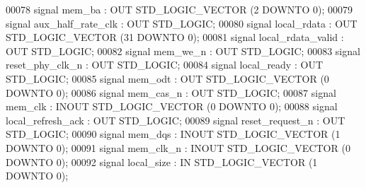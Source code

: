\begin{DoxyCode}
{00078         \textcolor{keywordflow}{signal} mem_ba : \textcolor{keywordflow}{OUT} \textcolor{comment}{STD\_LOGIC\_VECTOR} (\textcolor{vhdllogic}{}\textcolor{vhdllogic}{2} \textcolor{keywordflow}{DOWNTO} \textcolor{vhdllogic}{}\textcolor{vhdllogic}{0});
00079         \textcolor{keywordflow}{signal} aux_half_rate_clk : \textcolor{keywordflow}{OUT} \textcolor{comment}{STD\_LOGIC};
00080         \textcolor{keywordflow}{signal} local_rdata : \textcolor{keywordflow}{OUT} \textcolor{comment}{STD\_LOGIC\_VECTOR} (\textcolor{vhdllogic}{}\textcolor{vhdllogic}{31} \textcolor{keywordflow}{DOWNTO} \textcolor{vhdllogic}{}\textcolor{vhdllogic}{0});
00081         \textcolor{keywordflow}{signal} local_rdata_valid : \textcolor{keywordflow}{OUT} \textcolor{comment}{STD\_LOGIC};
00082         \textcolor{keywordflow}{signal} mem_we_n : \textcolor{keywordflow}{OUT} \textcolor{comment}{STD\_LOGIC};
00083         \textcolor{keywordflow}{signal} reset_phy_clk_n : \textcolor{keywordflow}{OUT} \textcolor{comment}{STD\_LOGIC};
00084         \textcolor{keywordflow}{signal} local_ready : \textcolor{keywordflow}{OUT} \textcolor{comment}{STD\_LOGIC};
00085         \textcolor{keywordflow}{signal} mem_odt : \textcolor{keywordflow}{OUT} \textcolor{comment}{STD\_LOGIC\_VECTOR} (\textcolor{vhdllogic}{}\textcolor{vhdllogic}{0} \textcolor{keywordflow}{DOWNTO} \textcolor{vhdllogic}{}\textcolor{vhdllogic}{0});
00086         \textcolor{keywordflow}{signal} mem_cas_n : \textcolor{keywordflow}{OUT} \textcolor{comment}{STD\_LOGIC};
00087         \textcolor{keywordflow}{signal} mem_clk : \textcolor{keywordflow}{INOUT} \textcolor{comment}{STD\_LOGIC\_VECTOR} (\textcolor{vhdllogic}{}\textcolor{vhdllogic}{0} \textcolor{keywordflow}{DOWNTO} \textcolor{vhdllogic}{}\textcolor{vhdllogic}{0});
00088         \textcolor{keywordflow}{signal} local_refresh_ack : \textcolor{keywordflow}{OUT} \textcolor{comment}{STD\_LOGIC};
00089         \textcolor{keywordflow}{signal} reset_request_n : \textcolor{keywordflow}{OUT} \textcolor{comment}{STD\_LOGIC};
00090         \textcolor{keywordflow}{signal} mem_dqs : \textcolor{keywordflow}{INOUT} \textcolor{comment}{STD\_LOGIC\_VECTOR} (\textcolor{vhdllogic}{}\textcolor{vhdllogic}{1} \textcolor{keywordflow}{DOWNTO} \textcolor{vhdllogic}{}\textcolor{vhdllogic}{0});
00091         \textcolor{keywordflow}{signal} mem_clk_n : \textcolor{keywordflow}{INOUT} \textcolor{comment}{STD\_LOGIC\_VECTOR} (\textcolor{vhdllogic}{}\textcolor{vhdllogic}{0} \textcolor{keywordflow}{DOWNTO} \textcolor{vhdllogic}{}\textcolor{vhdllogic}{0});
00092         \textcolor{keywordflow}{signal} local_size : \textcolor{keywordflow}{IN} \textcolor{comment}{STD\_LOGIC\_VECTOR} (\textcolor{vhdllogic}{}\textcolor{vhdllogic}{1} \textcolor{keywordflow}{DOWNTO} \textcolor{vhdllogic}{}\textcolor{vhdllogic}{0});
}
\end{DoxyCode}

